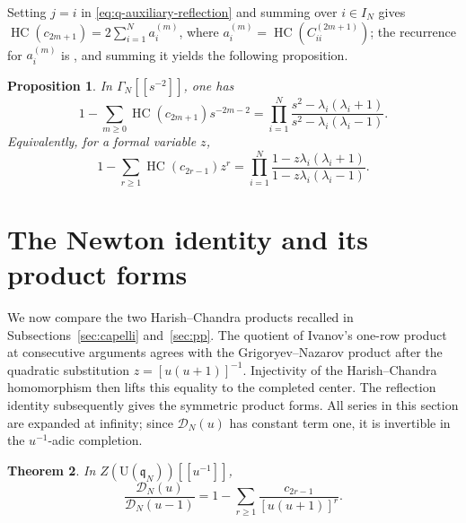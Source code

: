 \documentclass[11pt]{amsart}
\numberwithin{equation}{section}
\newtheorem{theorem}{Theorem}[section]
\newtheorem{proposition}[theorem]{Proposition}
\theoremstyle{definition}
\theoremstyle{remark}
\newcommand{\q}{\mathfrak q}
\newcommand{\U}{\mathrm U}
\newcommand{\HC}{\operatorname{HC}}
\newcommand{\calD}{\mathcal D}
\begin{document}
Setting \(j=i\) in \eqref{eq:q-auxiliary-reflection} and summing over
\(i\in I_N\) gives \(\HC(c_{2m+1})=2\sum_{i=1}^N a_i^{(m)}\), where
\(a_i^{(m)}=\HC(C^{(2m+1)}_{ii})\); the recurrence for \(a_i^{(m)}\) is
\cite[Proposition~5]{GN2019}, and summing it yields the following proposition. 

\begin{proposition}
\label{prop:PP-product}
In \(\Gamma_N[[s^{-2}]]\), one has
\begin{equation}
 1-\sum_{m\geq0}\HC(c_{2m+1})s^{-2m-2}
 =
 \prod_{i=1}^N
 \frac{s^2-\lambda_i(\lambda_i+1)}
      {s^2-\lambda_i(\lambda_i-1)}.
 \label{eq:PP-product}
\end{equation}
Equivalently, for a formal variable \(z\),
\begin{equation}
 1-\sum_{r\geq1}\HC(c_{2r-1})z^r
 =
 \prod_{i=1}^N
 \frac{1-z\lambda_i(\lambda_i+1)}
      {1-z\lambda_i(\lambda_i-1)}.
 \label{eq:PP-z}
\end{equation}
\end{proposition}

\section{The Newton identity and its product forms}
\label{sec:newton}

We now compare the two Harish--Chandra products recalled in
Subsections~\ref{sec:capelli} and~\ref{sec:pp}.  The quotient of
Ivanov's one-row product at consecutive arguments agrees with the
Grigoryev--Nazarov product after the quadratic substitution
\(z=[u(u+1)]^{-1}\).  Injectivity of the Harish--Chandra homomorphism
then lifts this equality to the completed center.  The reflection
identity subsequently gives the symmetric product forms.  All series
in this section are expanded at infinity; since \(\calD_N(u)\) has
constant term one, it is invertible in the \(u^{-1}\)-adic completion.

\begin{theorem}
\label{thm:queer-newton}
In \(Z(\U(\q_N))[[u^{-1}]]\),
\begin{equation}
 \boxed{
 \frac{\calD_N(u)}{\calD_N(u-1)}
 =1-\sum_{r\geq1}\frac{c_{2r-1}}{[u(u+1)]^r}.}
 \label{eq:queer-newton}
\end{equation}
\end{theorem}
\end{document}

